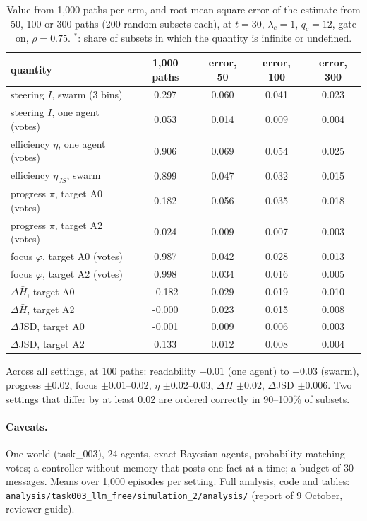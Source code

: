 \documentclass[10pt,a4paper]{article}
\begin{document}
\begin{table}[H]
\centering\small
\caption{Value from 1{,}000 paths per arm, and root-mean-square error of the estimate from 50, 100
or 300 paths (200 random subsets each), at $t = 30$, $\lambda_c = 1$, $q_c = 12$, gate on, $\rho = 0.75$. $^\ast$: share of subsets in which
the quantity is infinite or undefined.}
\label{tab:effprec}
\begin{tabular}{lcccc}
\toprule
quantity & 1{,}000 paths & error, 50 & error, 100 & error, 300 \\
\midrule
steering $I$, swarm (3 bins) & 0.297 & 0.060 & 0.041 & 0.023 \\
steering $I$, one agent (votes) & 0.053 & 0.014 & 0.009 & 0.004 \\
efficiency $\eta$, one agent (votes) & 0.906 & 0.069 & 0.054 & 0.025 \\
efficiency $\eta_{JS}$, swarm & 0.899 & 0.047 & 0.032 & 0.015 \\
progress $\pi$, target A0 (votes) & 0.182 & 0.056 & 0.035 & 0.018 \\
progress $\pi$, target A2 (votes) & 0.024 & 0.009 & 0.007 & 0.003 \\
focus $\varphi$, target A0 (votes) & 0.987 & 0.042 & 0.028 & 0.013 \\
focus $\varphi$, target A2 (votes) & 0.998 & 0.034 & 0.016 & 0.005 \\
$\Delta\bar H$, target A0 & -0.182 & 0.029 & 0.019 & 0.010 \\
$\Delta\bar H$, target A2 & -0.000 & 0.023 & 0.015 & 0.008 \\
$\Delta$JSD, target A0 & -0.001 & 0.009 & 0.006 & 0.003 \\
$\Delta$JSD, target A2 & 0.133 & 0.012 & 0.008 & 0.004 \\
\bottomrule
\end{tabular}
\end{table}

\noindent Across all settings, at 100 paths: readability $\pm0.01$ (one agent) to $\pm0.03$ (swarm),
progress $\pm0.02$, focus $\pm0.01$--$0.02$, $\eta$ $\pm0.02$--$0.03$, $\Delta\bar H$ $\pm0.02$, $\Delta$JSD
$\pm0.006$. Two settings that differ by at least 0.02 are ordered correctly in 90--100\% of subsets.

\paragraph{Caveats.} One world (task\_003), 24 agents, exact-Bayesian agents,
probability-matching votes; a controller without memory that posts one fact at a time; a
budget of 30 messages. Means over 1{,}000 episodes per setting. Full analysis, code and
tables: \texttt{analysis/task003\_llm\_free/simulation\_2/analysis/} (report of 9 October,
reviewer guide).
\end{document}
